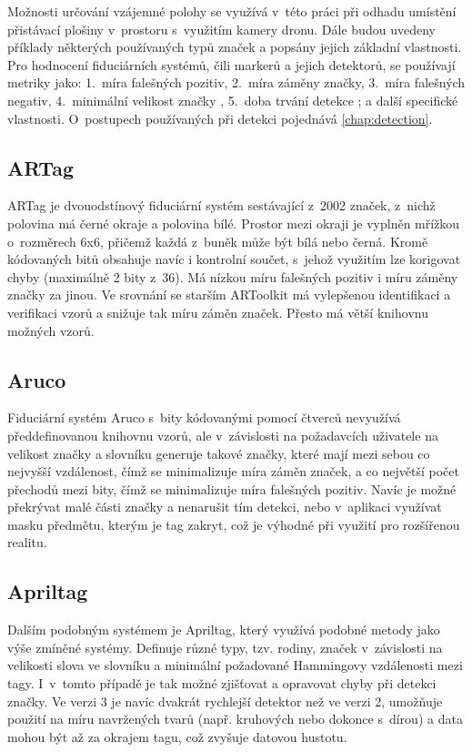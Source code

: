     Možnosti určování vzájemné polohy se využívá v~této práci při odhadu umístění přistávací plošiny v~prostoru s~využitím kamery dronu. Dále budou uvedeny příklady některých používaných typů značek a popsány jejich základní vlastnosti. Pro hodnocení fiduciárních systémů, čili markerů a jejich detektorů, se používají metriky jako: 1.~míra falešných pozitiv, 2.~míra záměny značky, 3.~míra falešných negativ, 4.~minimální velikost značky \cite{artag}, 5.~doba trvání detekce \cite{aruco}; \cite{apriltag2} a další specifické vlastnosti. O~postupech používaných při detekci pojednává \cref{chap:detection}.
    \subsection{ARTag}
      ARTag je dvouodstínový fiduciární systém sestávající z~2002 značek, z~nichž polovina má černé okraje a polovina bílé. Prostor mezi okraji je vyplněn mřížkou o~rozměrech 6x6, přičemž každá z~buněk může být bílá nebo černá. Kromě kódovaných bitů obsahuje navíc i kontrolní součet, s~jehož využitím lze korigovat chyby (maximálně 2 bity z~36). Má nízkou míru falešných pozitiv i míru záměny značky za jinou. Ve srovnání se starším ARToolkit má vylepšenou identifikaci a verifikaci vzorů a snižuje tak míru záměn značek. Přesto má větší knihovnu možných vzorů. \cite{artag}
    \subsection{Aruco}
      Fiduciární systém Aruco s~bity kódovanými pomocí čtverců nevyužívá předdefinovanou knihovnu vzorů, ale v~závislosti na požadavcích uživatele na velikost značky a slovníku generuje takové značky, které mají mezi sebou co nejvyšší vzdálenost, čímž se minimalizuje míra záměn značek, a co největší počet přechodů mezi bity, čímž se minimalizuje míra falešných pozitiv. Navíc je možné překrývat malé části značky a nenarušit tím detekci, nebo v~aplikaci využívat masku předmětu, kterým je tag zakryt, což je výhodné při využití pro rozšířenou realitu. \cite{aruco}
    \subsection{Apriltag}
      Dalším podobným systémem je Apriltag, který využívá podobné metody jako výše zmíněné systémy. Definuje různé typy, tzv. rodiny, značek v~závislosti na velikosti slova ve slovníku a minimální požadované Hammingovy vzdálenosti mezi tagy. I~v~tomto případě je tak možné zjišťovat a opravovat chyby při detekci značky. \cite{apriltag2} Ve verzi 3 je navíc dvakrát rychlejší detektor než ve verzi 2, umožňuje použití na míru navržených tvarů (např. kruhových nebo dokonce s~dírou) a data mohou být až za okrajem tagu, což zvyšuje datovou hustotu. \cite{apriltag3}


